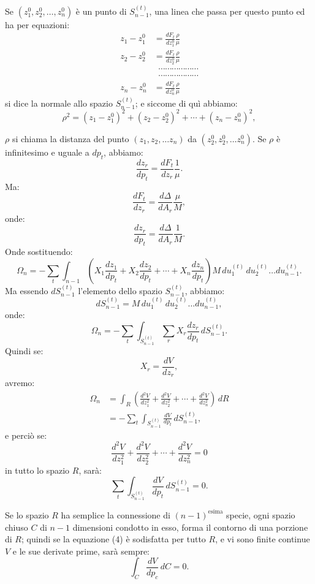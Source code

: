 \documentclass{article}
\begin{document}
Se $(z_{1}^{0}, z_{2}^{0},\ldots, z_{n}^{0})$ è un punto di $S^{(t)}_{n-1}$, una linea che passa per questo punto ed ha per equazioni:
\[ \begin{aligned} z_{1} - z_{1}^{0} &= \frac{dF_{t}}{dz_{1}^{0}}\frac{\rho}{\mu} \\ z_{2} - z_{2}^{0} &= \frac{dF_{t}}{dz_{2}^{0}}\frac{\rho}{\mu} \\ &\;\;\cdots\cdots\cdots\cdots\cdots\cdots\\ &\;\;\cdots\cdots\cdots\cdots\cdots\cdots\\ z_{n} - z_{n}^{0} &= \frac{dF_{t}}{dz_{n}^{0}}\frac{\rho}{\mu} \end{aligned} \]
si dice la normale allo spazio $S^{(t)}_{n-1}$; e siccome di quì abbiamo:
\[ \rho^{2} = (z_{1} - z_{1}^{0})^{2} + (z_{2} - z_{2}^{0})^{2} + \cdots + (z_{n} - z_{n}^{0})^{2}, \]

$\rho$ si chiama la distanza del punto $(z_{1}, z_{2},\ldots z_{n})$ da $(z_{2}^{0}, z_{2}^{0},\ldots z_{n}^{0})$. Se $\rho$ è infinitesimo e uguale a $dp_{t}$, abbiamo:
\[ \frac{dz_{r}}{dp_{t}} = \frac{dF_{t}}{dz_{r}}\frac{1}{\mu}. \]
Ma:
\[ \frac{dF_{t}}{dz_{r}} = \frac{d\Delta}{dA_{r}}\frac{\mu}{M}, \]
onde:
\[ \frac{dz_{r}}{dp_{t}} = \frac{d\Delta}{dA_{r}}\frac{1}{M}. \]
Onde sostituendo:
\[ \Omega_{n} = - \sum_{t} \int_{n-1} \left( X_{1} \frac{dz_{1}}{dp_{t}} + X_{2} \frac{dz_{2}}{dp_{t}} + \cdots + X_{n} \frac{dz_{n}}{dp_{t}} \right) M\,du^{(t)}_{1}\,du^{(t)}_{2}\ldots du^{(t)}_{n-1}. \]
Ma essendo $dS^{(t)}_{n-1}$ l'elemento dello spazio $S^{(t)}_{n-1}$, abbiamo:
\[ dS^{(t)}_{n-1} = M\,du^{(t)}_{1}\,du^{(t)}_{2}\ldots du^{(t)}_{n-1}, \]
onde:
\[ \Omega_{n} = - \sum_{t} \int_{S^{(t)}_{n-1}} \sum_{r} X_{r} \frac{dz_{r}}{dp_{t}}\,dS^{(t)}_{n-1}. \]
Quindi se:
\[ X_{r} = \frac{dV}{dz_{r}}, \]
avremo:
\[ \begin{aligned} \Omega_{n} &= \int_{R} \left( \frac{d^{2}V}{dz_{1}^{2}} + \frac{d^{2}V}{dz_{2}^{2}} + \cdots + \frac{d^{2}V}{dz_{n}^{2}} \right)\,dR \\ &= - \sum_{t} \int_{S^{(t)}_{n-1}} \frac{dV}{dp_{t}}\,dS^{(t)}_{n-1}, \end{aligned} \]
e perciò se:
\[ \frac{d^{2}V}{dz_{1}^{2}} + \frac{d^{2}V}{dz_{2}^{2}} + \cdots + \frac{d^{2}V}{dz_{n}^{2}} = 0 \tag{4} \]
in tutto lo spazio $R$, sarà:
\[ \sum_{t} \int_{S^{(t)}_{n-1}} \frac{dV}{dp_{t}}\,dS^{(t)}_{n-1} = 0. \tag{5} \]


Se lo spazio $R$ ha semplice la connessione di $(n-1)^{\text{esima}}$ specie, ogni spazio chiuso $C$ di $n-1$ dimensioni condotto in esso, forma il contorno di una porzione di $R$; quindi se la equazione (4) è sodisfatta per tutto $R$, e vi sono finite continue $V$ e le sue derivate prime, sarà sempre:
\[ \int_{C} \frac{dV}{dp_{c}}\,dC = 0. \]
\end{document}
